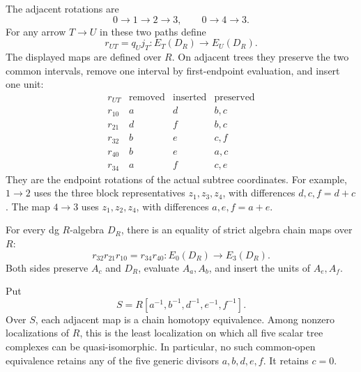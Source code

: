 The adjacent rotations are
\[
 0\longrightarrow1\longrightarrow2\longrightarrow3,
 \qquad 0\longrightarrow4\longrightarrow3.
\]
For any arrow \(T\to U\) in these two paths define
\[
 r_{UT}=q_Uj_T:E_T(D_R)\longrightarrow E_U(D_R).
\]
The displayed maps are defined over \(R\).  On adjacent trees
they preserve the two common intervals, remove one interval by
first-endpoint evaluation, and insert one unit:
\begin{equation}\label{fp:eq:four-adjacent-maps}
\begin{array}{c|cc|c}
 r_{UT}&\text{removed}&\text{inserted}&\text{preserved}\\\hline
 r_{10}&a&d&b,c\\
 r_{21}&d&f&b,c\\
 r_{32}&b&e&c,f\\
 r_{40}&b&e&a,c\\
 r_{34}&a&f&c,e
\end{array}
\end{equation}
They are the endpoint rotations of the actual subtree coordinates.
For example, \(1\to2\) uses the three block representatives
\(z_1,z_3,z_4\), with differences \(d,c,f=d+c\).
The map \(4\to3\) uses \(z_1,z_2,z_4\), with differences
\(a,e,f=a+e\).

\begin{theorem}
\label{fp:thm:four-coefficient-pentagon}
For every dg \(R\)-algebra \(D_R\), there is an equality
of strict algebra chain maps over \(R\):
\begin{equation}\label{fp:eq:four-pentagon-coefficients}
 r_{32}r_{21}r_{10}=r_{34}r_{40}:E_0(D_R)\longrightarrow E_3(D_R).
\end{equation}
Both sides preserve \(A_c\) and \(D_R\), evaluate \(A_a,A_b\),
and insert the units of \(A_e,A_f\).

Put
\begin{equation}\label{fp:eq:four-maximal-open}
 S=R[a^{-1},b^{-1},d^{-1},e^{-1},f^{-1}].
\end{equation}
Over \(S\), each adjacent map is a chain homotopy equivalence.
Among nonzero localizations of \(R\), this is the least localization
on which all five scalar tree complexes can be quasi-isomorphic.
In particular, no such common-open equivalence retains any of the
five generic divisors \(a,b,d,e,f\).  It retains \(c=0\).
\end{theorem}

